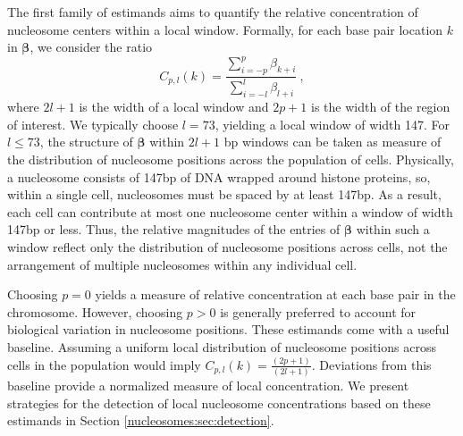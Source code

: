 The first family of estimands aims to quantify the relative concentration of nucleosome centers within a local window.
Formally, for each base pair location $k$ in $\bm \beta$, we consider the ratio
\begin{equation}
C_{p,l}(k) = \frac{\sum_{i=-p}^{p} \beta_{k + i}}{\sum_{i=-l}^{l} \beta_{l + i}} \label{nucleosomes:eq:concentration} \ ,
\end{equation}
where $2l + 1$ is the width of a local window and $2p + 1$ is the width of the region of interest.
We typically choose $l = 73$, yielding a local window of width 147.
%
For $l \leq 73$, the structure of $\bm \beta$ within $2l+1$ bp windows can be taken as measure of the distribution of nucleosome positions across the population of cells.
Physically, a nucleosome consists of 147bp of DNA wrapped around histone proteins, so, within a single cell, nucleosomes must be spaced by at least 147bp.
As a result, each cell can contribute at most one nucleosome center within a window of width 147bp or less.
Thus, the relative magnitudes of the entries of $\bm \beta$ within such a window reflect only the distribution of nucleosome positions across cells, not the arrangement of multiple nucleosomes within any individual cell.

Choosing $p = 0$ yields a measure of relative concentration at each base pair in the chromosome.
However, choosing $p > 0$ is generally preferred to account for biological variation in nucleosome positions.
These estimands come with a useful baseline.
Assuming a uniform local distribution of nucleosome positions across cells in the population would imply $C_{p,l}(k) = \frac{(2p+1)}{(2l+1)}$.
Deviations from this baseline provide a normalized measure of local concentration.
We present strategies for the detection of local nucleosome concentrations based on these estimands in Section \ref{nucleosomes:sec:detection}.

